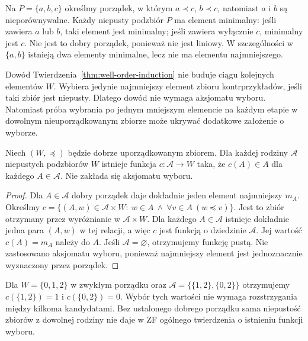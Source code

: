 \begin{przyklad}
Na $P=\{a,b,c\}$ określmy porządek, w którym
$a\prec c$, $b\prec c$, natomiast $a$ i $b$ są
nieporównywalne. Każdy niepusty podzbiór $P$ ma element
minimalny: jeśli zawiera $a$ lub $b$, taki element jest
minimalny; jeśli zawiera wyłącznie $c$, minimalny jest $c$.
Nie jest to dobry porządek, ponieważ nie jest liniowy.
W szczególności w $\{a,b\}$ istnieją dwa elementy
minimalne, lecz nie ma elementu najmniejszego.
\end{przyklad}

\begin{uwaga}
Dowód Twierdzenia~\ref{thm:well-order-induction} nie buduje
ciągu kolejnych elementów $W$. Wybiera jedynie najmniejszy
element zbioru kontrprzykładów, jeśli taki zbiór jest niepusty.
Dlatego dowód nie wymaga aksjomatu wyboru. Natomiast próba
wybrania po jednym mniejszym elemencie na każdym etapie
w dowolnym nieuporządkowanym zbiorze może ukrywać dodatkowe
założenie o wyborze.
\end{uwaga}

\begin{wniosek}
\label{cor:lxv-wellorder-minimal-selection}
Niech $(W,\preceq)$ będzie dobrze uporządkowanym zbiorem.
Dla każdej rodziny $\mathcal A$ niepustych podzbiorów $W$
istnieje funkcja $c:\mathcal A\to W$ taka, że
$c(A)\in A$ dla każdego $A\in\mathcal A$.
Nie zakłada się aksjomatu wyboru.
\end{wniosek}
\begin{proof}
Dla $A\in\mathcal A$ dobry porządek daje dokładnie jeden
element najmniejszy $m_A$. Określmy
$c=\{(A,w)\in\mathcal A\times W:\ w\in A\ \land\
\forall v\in A\ (w\preceq v)\}$.
Jest to zbiór otrzymany przez wyróżnianie w
$\mathcal A\times W$. Dla każdego $A\in\mathcal A$
istnieje dokładnie jedna para $(A,w)$ w tej relacji,
a więc $c$ jest funkcją o dziedzinie $\mathcal A$.
Jej wartość $c(A)=m_A$ należy do $A$.
Jeśli $\mathcal A=\varnothing$, otrzymujemy funkcję pustą.
Nie zastosowano aksjomatu wyboru, ponieważ najmniejszy
element jest jednoznacznie wyznaczony przez porządek.
\end{proof}
\begin{przyklad}
\label{ex:lxv-wellorder-minimal-selection}
Dla $W=\{0,1,2\}$ w zwykłym porządku oraz
$\mathcal A=\{\{1,2\},\{0,2\}\}$ otrzymujemy
$c(\{1,2\})=1$ i $c(\{0,2\})=0$.
Wybór tych wartości nie wymaga rozstrzygania między
kilkoma kandydatami. Bez ustalonego dobrego porządku
sama niepustość zbiorów z dowolnej rodziny nie daje
w ZF ogólnego twierdzenia o istnieniu funkcji wyboru.
\end{przyklad}

